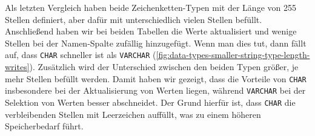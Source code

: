 \vspace{-20pt}

Als letzten Vergleich haben beide Zeichenketten-Typen mit der Länge von 255 Stellen definiert, aber dafür mit unterschiedlich vielen Stellen befüllt.
Anschließend haben wir bei beiden Tabellen die Werte aktualisiert und wenige Stellen bei der Namen-Spalte zufällig hinzugefügt.
Wenn man dies tut, dann fällt auf, dass \texttt{CHAR} schneller ist als \texttt{VARCHAR} (\ref{fig:data-types-smaller-string-type-length-writes}).
Zusätzlich wird der Unterschied zwischen den beiden Typen größer, je mehr Stellen befüllt werden.
Damit haben wir gezeigt, dass die Vorteile von \texttt{CHAR} insbesondere bei der Aktualisierung von Werten liegen, während \texttt{VARCHAR} bei der Selektion von Werten besser abschneidet.
Der Grund hierfür ist, dass \texttt{CHAR} die verbleibenden Stellen mit Leerzeichen auffüllt, was zu einem höheren Speicherbedarf führt.